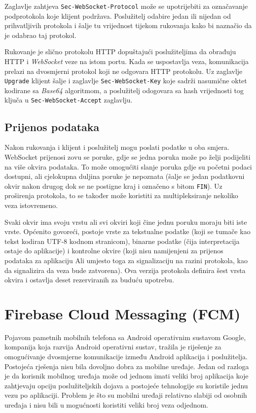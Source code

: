 \documentclass[times, utf8, zavrsni]{fer}
\begin{document}
{Zaglavlje zahtjeva {\tt Sec-WebSocket-Protocol} može se upotrijebiti za označavanje podprotokola koje klijent podržava. Poslužitelj odabire jedan ili nijedan od prihvatljivih protokola i šalje tu vrijednost tijekom rukovanja kako bi naznačio da je odabrao taj protokol.

Rukovanje je slično protokolu HTTP dopuštajući poslužiteljima da obrađuju HTTP i {\em WebSocket} veze na istom portu. Kada se uspostavlja veza, komunikacija prelazi na dvosmjerni protokol koji ne odgovara HTTP protokolu. Uz zaglavlje {\tt Upgrade} klijent šalje i zaglavlje {\tt Sec-WebSocket-Key} koje sadrži nasumične oktet kodirane sa {\em Base64} algoritmom, a poslužitelj odogovara sa hash vrijednosti tog ključa u {\tt Sec-WebSocket-Accept} zaglavlju.

\subsection{Prijenos podataka}
Nakon rukovanja i klijent i poslužitelj mogu poslati podatke u oba smjera. WebSocket prijenosi zovu se poruke, gdje se jedna poruka može po želji podijeliti na više okvira podataka. To može omogućiti slanje poruka gdje su početni podaci dostupni, ali cjelokupna duljina poruke je nepoznata (šalje se jedan podatkovni okvir nakon drugog dok se ne postigne kraj i označeno s bitom {\tt FIN}). Uz proširenja protokola, to se također može koristiti za multipleksiranje nekoliko veza istovremeno. 

Svaki okvir ima svoju vrstu ali svi okviri koji čine jednu poruku moraju biti iste vrste. Općenito govoreći, postoje vrste za tekstualne podatke (koji se tumače kao tekst kodiran UTF-8 kodnom stranicom), binarne podatke (čija interpretacija ostaje do aplikacije) i kontrolne okvire (koji nisu namijenjeni za prijenos podataka za aplikaciju Ali umjesto toga za signalizaciju na razini protokola, kao da signalizira da veza bude zatvorena). Ova verzija protokola definira šest vrsta okvira i ostavlja deset rezerviranih za buduću upotrebu.

\section{Firebase Cloud Messaging (FCM)}

Pojavom pametnih mobilnih telefona sa Android operativnim sustavom Google, kompanija koja razvija Android operativni sustav, tražila je riješenje za omogućivanje dvosmjerne komunikacije između Android aplikacija i poslužitelja. Postojeća rješenja nisu bila dovoljno dobra za mobilne uređaje. Jedan od razloga je da korisnik mobilnog uređaja može od jednom imati veliki broj aplikacija koje zahtjevaju opciju poslužiteljskih dojava a postojeće tehnologije su koristile jednu vezu po aplikaciji. Problem je što su mobilni uređaji relativno slabiji od osobnih uređaja i nisu bili u mogućnosti koristiti veliki broj veza odjednom.

}
\end{document}
